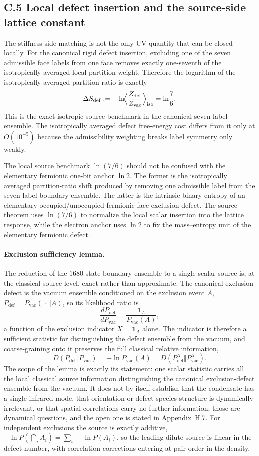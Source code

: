 \documentclass[11pt]{article}
\begin{document}
\subsection*{C.5 Local defect insertion and the source-side lattice constant}

The stiffness-side matching is not the only UV quantity that can be closed locally. For the canonical rigid defect insertion, excluding one of the seven admissible face labels from one face removes exactly one-seventh of the isotropically averaged local partition weight. Therefore the logarithm of the isotropically averaged partition ratio is exactly
\[
\Delta S_{\mathrm{def}}
:=
-\ln\!\Bigl\langle \frac{Z_{\mathrm{def}}}{Z_{\mathrm{vac}}}\Bigr\rangle_{\mathrm{iso}}
=
\ln\!\frac{7}{6}.
\]
This is the exact isotropic source benchmark in the canonical seven-label ensemble. The isotropically averaged defect free-energy cost differs from it only at $O(10^{-5})$ because the admissibility weighting breaks label symmetry only weakly.

The local source benchmark $\ln(7/6)$ should not be confused with the elementary fermionic one-bit anchor $\ln2$. The former is the isotropically averaged partition-ratio shift produced by removing one admissible label from the seven-label boundary ensemble. The latter is the intrinsic binary entropy of an elementary occupied/unoccupied fermionic face-exclusion defect. The source theorem uses $\ln(7/6)$ to normalize the local scalar insertion into the lattice response, while the electron anchor uses $\ln2$ to fix the mass--entropy unit of the elementary fermionic defect.

\paragraph{Exclusion sufficiency lemma.}
The reduction of the $1680$-state boundary ensemble to a single scalar source is, at the classical source level, exact rather than approximate. The canonical exclusion defect is the vacuum ensemble conditioned on the exclusion event $A$, $P_{\mathrm{def}}=P_{\mathrm{vac}}(\,\cdot\,|A)$, so its likelihood ratio is
\[
\frac{dP_{\mathrm{def}}}{dP_{\mathrm{vac}}}=\frac{\mathbf 1_A}{P_{\mathrm{vac}}(A)},
\]
a function of the exclusion indicator $X=\mathbf 1_A$ alone. The indicator is therefore a sufficient statistic for distinguishing the defect ensemble from the vacuum, and coarse-graining onto it preserves the full classical relative information,
\[
D(P_{\mathrm{def}}\Vert P_{\mathrm{vac}})=-\ln P_{\mathrm{vac}}(A)=D(P_{\mathrm{def}}^X\Vert P_{\mathrm{vac}}^X).
\]
The scope of the lemma is exactly its statement: one scalar statistic carries all the local classical source information distinguishing the canonical exclusion-defect ensemble from the vacuum. It does not by itself establish that the condensate has a single infrared mode, that orientation or defect-species structure is dynamically irrelevant, or that spatial correlations carry no further information; those are dynamical questions, and the open one is stated in Appendix~H.7. For independent exclusions the source is exactly additive, $-\ln P(\bigcap_iA_i)=\sum_i-\ln P(A_i)$, so the leading dilute source is linear in the defect number, with correlation corrections entering at pair order in the density.
\end{document}
